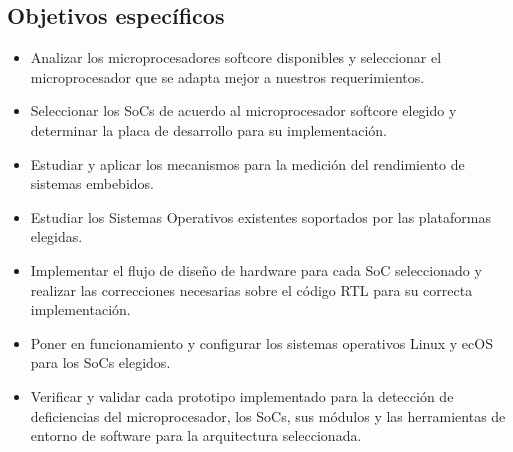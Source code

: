 \documentclass[conference]{IEEEtran}
\begin{document}
\subsection{Objetivos específicos}%
 \begin{itemize}
 \item Analizar los microprocesadores softcore disponibles y seleccionar el microprocesador que se adapta mejor a nuestros requerimientos.

\item Seleccionar los SoCs de acuerdo al microprocesador softcore elegido y determinar la placa de desarrollo para su implementación.

\item Estudiar y aplicar los mecanismos para la medición del rendimiento de sistemas embebidos. 

\item Estudiar los Sistemas Operativos existentes soportados por las plataformas elegidas.

\item Implementar el flujo de diseño de hardware para cada SoC seleccionado y realizar las correcciones necesarias sobre el código RTL para su correcta implementación. 

\item Poner en funcionamiento y configurar los sistemas operativos Linux y ecOS para los SoCs elegidos.

\item Verificar y validar cada prototipo implementado para la detección de deficiencias del microprocesador, los SoCs, sus módulos y las herramientas de entorno de software para la arquitectura seleccionada.



 \end{itemize}

%
%
%
\end{document}
